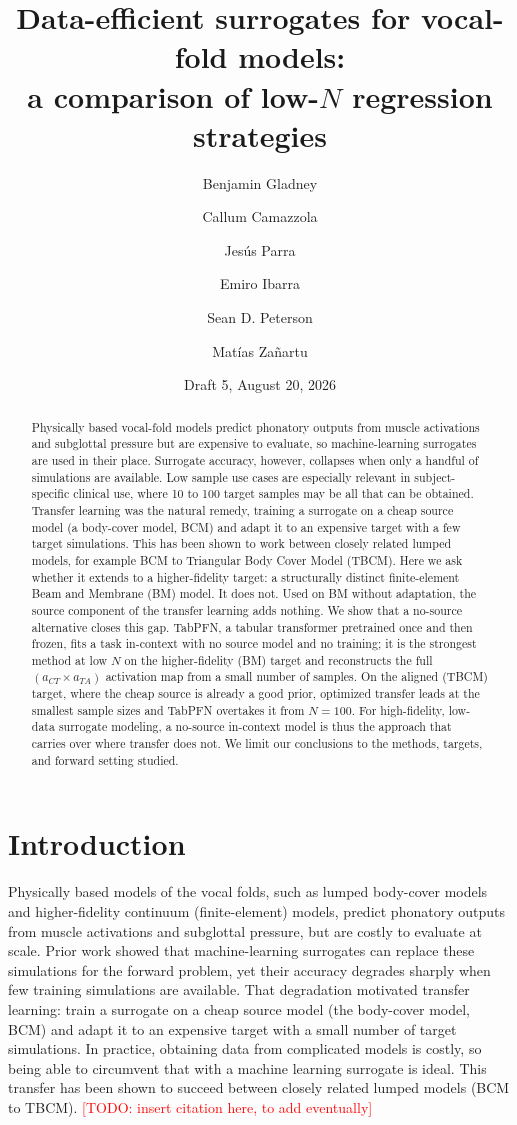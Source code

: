 \documentclass[11pt]{article}
\title{Data-efficient surrogates for vocal-fold models:\\
a comparison of low-$N$ regression strategies}
\author[1]{Benjamin Gladney}
\author[1]{Callum Camazzola}
\author[2]{Jes\'us Parra}
\author[2]{Emiro Ibarra}
\author[1]{Sean D. Peterson}
\author[2]{Mat\'ias Za\~nartu}
\affil[1]{University of Waterloo}
\affil[2]{Universidad T\'ecnica Federico Santa Mar\'ia}
\date{Draft 5, August 20, 2026}
\newcommand{\todo}[1]{\textcolor{red}{[TODO: #1]}}
\begin{document}
\maketitle

\begin{abstract}
Physically based vocal-fold models predict phonatory outputs from muscle
activations and subglottal pressure but are expensive to evaluate, so
machine-learning surrogates are used in their place. Surrogate accuracy, however,
collapses when only a handful of simulations are available. Low sample use cases
are especially relevant in subject-specific clinical use, where 10 to 100 target
samples may be all that can be obtained. Transfer learning was the natural
remedy, training a surrogate on a cheap source model (a body-cover model, BCM)
and adapt it to an expensive target with a few target simulations. This has been
shown to work between closely related lumped models, for example BCM to
Triangular Body Cover Model (TBCM). Here we ask whether it extends to a
higher-fidelity target: a structurally distinct finite-element Beam and Membrane
(BM) model. It does not. Used on BM without adaptation, the source component of
the transfer learning adds nothing. We show that a no-source alternative closes
this gap. TabPFN, a tabular transformer pretrained once and then frozen, fits a
task in-context with no source model and no training; it is the strongest method
at low $N$ on the higher-fidelity (BM) target and reconstructs the full
$(a_{CT} \times a_{TA})$ activation map from a small number of samples. On the
aligned (TBCM) target, where the cheap source is already a good prior, optimized
transfer leads at the smallest sample sizes and TabPFN overtakes it from
$N=100$. For high-fidelity, low-data surrogate modeling, a
no-source in-context model is thus the approach that carries over where transfer
does not. We limit our conclusions to the methods, targets, and forward setting
studied.
\end{abstract}

\section{Introduction}

Physically based models of the vocal folds, such as lumped body-cover models and
higher-fidelity continuum (finite-element) models, predict phonatory outputs from
muscle activations and subglottal pressure, but are costly to evaluate at scale.
Prior work showed that machine-learning surrogates can replace these simulations
for the forward problem, yet their accuracy degrades sharply when few training
simulations are available. That degradation motivated transfer learning: train a
surrogate on a cheap source model (the body-cover model, BCM) and adapt it to an
expensive target with a small number of target simulations. In practice,
obtaining data from complicated models is costly, so being able to circumvent
that with a machine learning surrogate is ideal. This transfer has been shown to
succeed between closely related lumped models (BCM to TBCM).
\todo{insert citation here, to add eventually}
\end{document}
